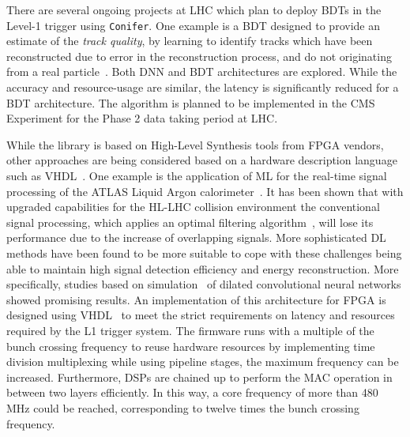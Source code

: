 There are several ongoing projects at LHC which plan to deploy BDTs in the Level-1 trigger using {\tt Conifer}. One example is a BDT designed to provide an estimate of the {\em track quality}, by learning to identify tracks which have been reconstructed due to error in the reconstruction process, and do not originating from a real particle~\cite{bdt_tq}. Both DNN and BDT architectures are explored.
While the accuracy and resource-usage are similar, the latency is significantly reduced for a BDT architecture. The algorithm is planned to be implemented in the CMS Experiment for the Phase 2 data taking period at LHC.

While the \hlsfml library is based on High-Level Synthesis tools from FPGA vendors, other approaches are being considered based on a hardware description language such as VHDL~\cite{Nottbeck:2019rqu,Fritzsche2020}. One example is the application of ML for the real-time signal processing of the ATLAS Liquid Argon calorimeter~\cite{atlas1996atlas}. It has been shown that with upgraded capabilities for the HL-LHC collision environment the conventional signal processing, which applies an optimal filtering algorithm~\cite{Cleland:2002rya}, will lose its performance due to the increase of overlapping signals. More sophisticated DL methods have been found to be more suitable to cope with these challenges being able to maintain high signal detection efficiency and energy reconstruction. More specifically, studies based on simulation~\cite{madysa-chep} of dilated convolutional neural networks showed promising results. An implementation of this architecture for FPGA is designed using VHDL~\cite{Fritzsche2020} to meet the strict requirements on latency and resources required by the L1 trigger system. The firmware runs with a multiple of the bunch crossing frequency to reuse hardware resources by implementing time division multiplexing while using pipeline stages, the maximum frequency can be increased. Furthermore, DSPs are chained up to perform the MAC operation in between two layers efficiently. In this way, a core frequency of more than 480 MHz could be reached, corresponding to twelve times the bunch crossing frequency.

